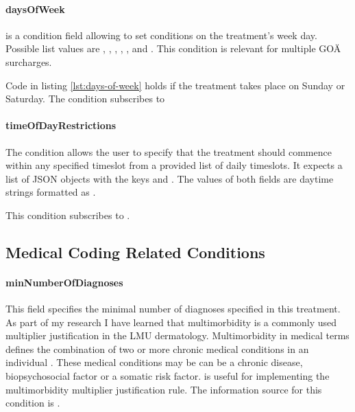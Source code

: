 \paragraph{daysOfWeek}
\daysOfWeek is a condition field allowing to set conditions on the treatment's week day.
Possible list values are , , , , ,  and .
This condition is relevant for multiple GOÄ surcharges.

Code  in listing \ref{lst:days-of-week} holds if the treatment takes place on Sunday or Saturday.
The \daysOfWeek condition subscribes to 

\paragraph{timeOfDayRestrictions}
The  condition allows the user to specify that the treatment should commence within any specified timeslot from a provided list of daily timeslots.
It expects a list of JSON objects with the keys  and .
The values of both fields are daytime strings formatted as .

This condition subscribes to .

\subsection{Medical Coding Related Conditions}\label{subsec:medical-coding-related-conditions}
\paragraph{minNumberOfDiagnoses}
This field specifies the minimal number of diagnoses specified in this treatment.
As part of my research I have learned that multimorbidity is a commonly used multiplier justification in the LMU dermatology.
Multimorbidity in medical terms defines the combination of two or more chronic medical conditions in an individual \cite{Reste2013The}.
These medical conditions may be can be a chronic disease, biopsychosocial factor or a somatic risk factor.
\minNumberOfDiagnoses is useful for implementing the multimorbidity multiplier justification rule.
The information source for this condition is .

